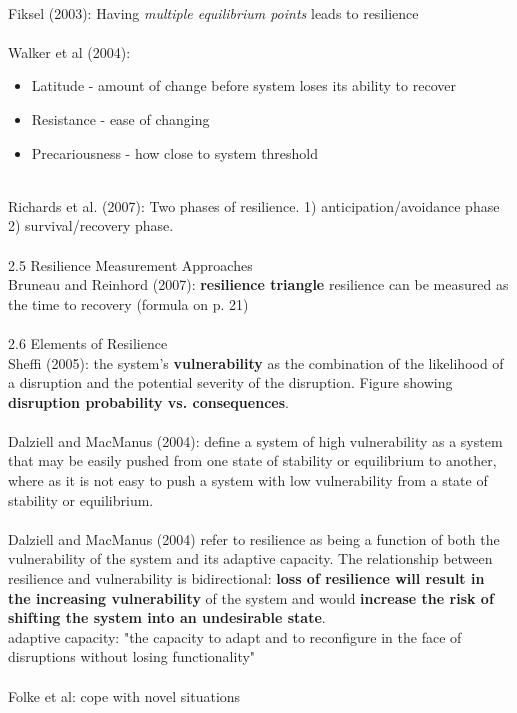 \noindent
\\
Fiksel (2003): Having \textit{multiple equilibrium points} leads to resilience
\\
\\
Walker et al (2004):
\begin{itemize}
  \item Latitude - amount of change before system loses its ability to recover
  \item Resistance - ease of changing
  \item Precariousness - how close to system threshold
\end{itemize}

\noindent
\\
Richards et al. (2007): Two phases of resilience. 1) anticipation/avoidance phase 2) survival/recovery phase. \\
\\
2.5 Resilience Measurement Approaches
\\
Bruneau and Reinhord (2007): \textbf{resilience triangle}
resilience can be measured as the time to recovery (formula on p. 21)
\\
\\
2.6 Elements of Resilience
\\
Sheffi (2005): the system's \textbf{vulnerability} as the combination of the likelihood of a disruption and the potential severity of the disruption.
Figure showing \textbf{disruption probability vs. consequences}.
\\
\\
Dalziell and MacManus (2004): define a system of high vulnerability as a system that may be easily pushed from one state of stability or equilibrium to another, where as it is not easy to push a system with low vulnerability from a state of stability or equilibrium.
\\
\\
Dalziell and MacManus (2004) refer to resilience as being a function of both the vulnerability of the system and its adaptive capacity. The relationship between resilience and vulnerability is bidirectional: \textbf{loss of resilience will result in the increasing vulnerability} of the system and would \textbf{increase the risk of shifting the system into an undesirable state}.
\\
adaptive capacity: "the capacity to adapt and to reconfigure in the face of disruptions without losing functionality" \\
\\
Folke et al: cope with novel situations \\
